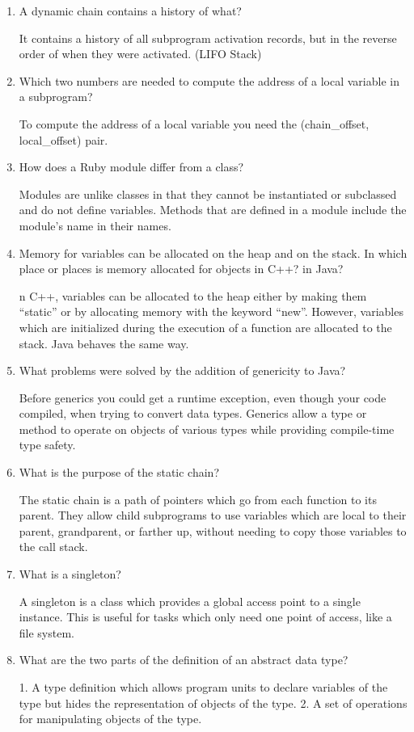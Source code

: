 \begin{enumerate}
\begin{answer}
\end{answer}
\item A dynamic chain contains a history of what?
\begin{answer}
It contains a history of all subprogram activation records, but in the reverse order of when they were activated. (LIFO Stack)
\end{answer}
\item Which two numbers are needed to compute
the address of a local variable in a subprogram?
\begin{answer}
To compute the address of a local variable you need the (chain_offset, local_offset) pair.
\end{answer}
\item How does a Ruby module differ from a class?
\begin{answer}
Modules are unlike classes in that they cannot be instantiated or subclassed
and do not define variables. Methods that are defined in a module include the
module’s name in their names.
\end{answer}
\item Memory for variables can be allocated on the heap
and on the stack. In which place or places is memory
allocated for objects in C++? in Java?
\begin{answer}
n C++, variables can be allocated to the heap either by making them “static” or by allocating memory with the keyword “new”. However, variables which are initialized during the execution of a function are allocated to the stack. Java behaves the same way.
\end{answer}
\item What problems were solved by the addition
of genericity to Java?
\begin{answer}
Before generics you could get a runtime exception, even though your code compiled, when trying to convert data types. Generics allow a type or method to operate on objects of various types while providing compile-time type safety.
\end{answer}
\item What is the purpose of the static chain?
\begin{answer}
The static chain is a path of pointers which go from each function to its parent. They allow child subprograms to use variables which are local to their parent, grandparent, or farther up, without needing to copy those variables to the call stack.
\end{answer}
\item What is a singleton?
\begin{answer}
A singleton is a class which provides a global access point to a single instance. This is useful for tasks which only need one point of access, like a file system.
\end{answer}
\item What are the two parts of the definition
of an abstract data type?
\begin{answer}
1. A type definition which allows program units to declare variables of the type but hides the representation of objects of the type. 2. A set of operations for manipulating objects of the type.
\end{answer}
\end{enumerate}
